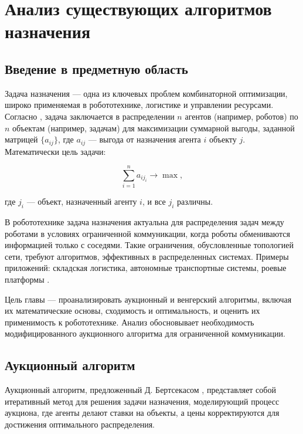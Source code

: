 \chapter{Анализ существующих алгоритмов назначения}
\label{ch:analysis}

\section{Введение в предметную область}
Задача назначения --- одна из ключевых проблем комбинаторной оптимизации, широко применяемая в робототехнике, логистике и управлении ресурсами. Согласно \cite{bertsekas1990}, задача заключается в распределении $n$ агентов (например, роботов) по $n$ объектам (например, задачам) для максимизации суммарной выгоды, заданной матрицей $\{a_{ij}\}$, где $a_{ij}$ --- выгода от назначения агента $i$ объекту $j$. Математически цель задачи:

\[
\sum_{i=1}^n a_{i j_i} \to \max,
\]

где $j_i$ --- объект, назначенный агенту $i$, и все $j_i$ различны.

В робототехнике задача назначения актуальна для распределения задач между роботами в условиях ограниченной коммуникации, когда роботы обмениваются информацией только с соседями. Такие ограничения, обусловленные топологией сети, требуют алгоритмов, эффективных в распределенных системах. Примеры приложений: складская логистика, автономные транспортные системы, роевые платформы \cite{kalyaev2009, gerkey2003}.

Цель главы --- проанализировать аукционный и венгерский алгоритмы, включая их математические основы, сходимость и оптимальность, и оценить их применимость к робототехнике. Анализ обосновывает необходимость модифицированного аукционного алгоритма для ограниченной коммуникации.

\section{Аукционный алгоритм}
Аукционный алгоритм, предложенный Д. Бертсекасом \cite{bertsekas1990}, представляет собой итеративный метод для решения задачи назначения, моделирующий процесс аукциона, где агенты делают ставки на объекты, а цены корректируются для достижения оптимального распределения.

